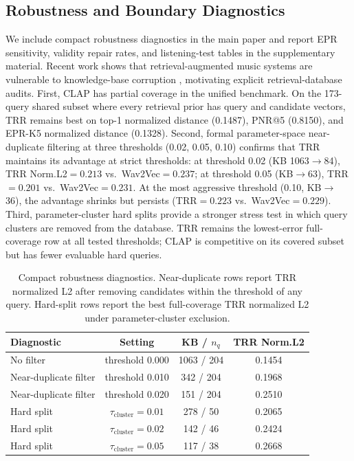\subsection{Robustness and Boundary Diagnostics}
\label{ssec:diagnostics}

We include compact robustness diagnostics in the main paper and report EPR sensitivity, validity repair rates, and listening-test tables in the supplementary material. Recent work shows that retrieval-augmented music systems are vulnerable to knowledge-base corruption \citep{wen2026mental}, motivating explicit retrieval-database audits. First, CLAP has partial coverage in the unified benchmark. On the 173-query shared subset where every retrieval prior has query and candidate vectors, TRR remains best on top-1 normalized distance (0.1487), PNR@5 (0.8150), and EPR-K5 normalized distance (0.1328). Second, formal parameter-space near-duplicate filtering at three thresholds (0.02, 0.05, 0.10) confirms that TRR maintains its advantage at strict thresholds: at threshold 0.02 (KB 1063$\rightarrow$84), TRR Norm.L2$=0.213$ vs.\ Wav2Vec$=0.237$; at threshold 0.05 (KB$\rightarrow$63), TRR$=0.201$ vs.\ Wav2Vec$=0.231$. At the most aggressive threshold (0.10, KB$\rightarrow$36), the advantage shrinks but persists (TRR$=0.223$ vs.\ Wav2Vec$=0.229$). Third, parameter-cluster hard splits provide a stronger stress test in which query clusters are removed from the database. TRR remains the lowest-error full-coverage row at all tested thresholds; CLAP is competitive on its covered subset but has fewer evaluable hard queries.

\begin{table}[t]
\centering
\caption{Compact robustness diagnostics. Near-duplicate rows report TRR normalized L2 after removing candidates within the threshold of any query. Hard-split rows report the best full-coverage TRR normalized L2 under parameter-cluster exclusion.}
\label{tab:robustness_summary}
\footnotesize
\setlength{\tabcolsep}{4pt}
\begin{tabular}{lccc}
\toprule
\textbf{Diagnostic} & \textbf{Setting} & \textbf{KB / $n_q$} & \textbf{TRR Norm.L2} \\
\midrule
No filter & threshold 0.000 & 1063 / 204 & 0.1454 \\
Near-duplicate filter & threshold 0.010 & 342 / 204 & 0.1968 \\
Near-duplicate filter & threshold 0.020 & 151 / 204 & 0.2510 \\
Hard split & $\tau_{\mathrm{cluster}}=0.01$ & 278 / 50 & 0.2065 \\
Hard split & $\tau_{\mathrm{cluster}}=0.02$ & 142 / 46 & 0.2424 \\
Hard split & $\tau_{\mathrm{cluster}}=0.05$ & 117 / 38 & 0.2668 \\
\bottomrule
\end{tabular}
\end{table}

